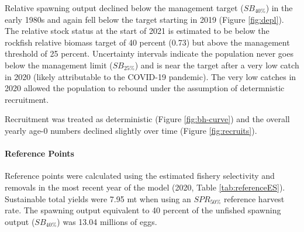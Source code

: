 \documentclass[11pt,
  english,
  a4paper,
]{article}
\begin{document}
Relative spawning output declined below the management target ({\(SB_{40\%}\)\leavevmode\tagmcend\tagstructend}) in the early 1980s and again fell below the target starting in 2019 (Figure \ref{fig:depl}). The relative stock status at the start of 2021 is estimated to be below the rockfish relative biomass target of 40 percent (0.73) but above the management threshold of 25 percent. Uncertainty intervals indicate the population never goes below the management limit ({\(SB_{25\%}\)\leavevmode\tagmcend\tagstructend}) and is near the target after a very low catch in 2020 (likely attributable to the COVID-19 pandemic). The very low catches in 2020 allowed the population to rebound under the assumption of determnistic recruitment.

\leavevmode\tagmcend\tagstructend\par


Recruitment was treated as deterministic (Figure \ref{fig:bh-curve}) and the overall yearly age-0 numbers declined slightly over time (Figure \ref{fig:recruits}).

\leavevmode\tagmcend\tagstructend\par


\hypertarget{reference-points-1}{%
\paragraph{Reference Points}\label{reference-points-1}}

\leavevmode\tagmcend\tagstructend


Reference points were calculated using the estimated fishery selectivity and removals in the most recent year of the model (2020, Table \ref{tab:referenceES}). Sustainable total yields were 7.95 mt when using an {\(SPR_{50\%}\)\leavevmode\tagmcend\tagstructend} reference harvest rate. The spawning output equivalent to 40 percent of the unfished spawning output ({\(SB_{40\%}\)\leavevmode\tagmcend\tagstructend}) was 13.04 millions of eggs.

\leavevmode\tagmcend\tagstructend\par
\end{document}
